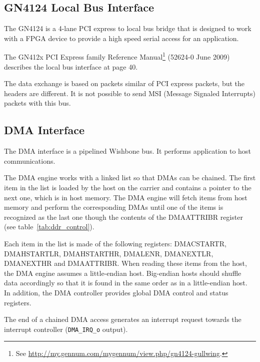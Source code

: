 \documentclass[10pt,a4paper]{cerndoc}
\begin{document}
    \subsection{GN4124 Local Bus Interface}
    
The GN4124 is a 4-lane PCI express to local bus bridge that is designed to work with a FPGA device to provide a high speed serial access for an application.
    
The GN412x PCI Express family Reference Manual\footnote{See \href{http://my.gennum.com/mygennum/view.php/gn4124-gullwing}{http://my.gennum.com/mygennum/view.php/gn4124-gullwing}.} (52624-0 June 2009) describes the local bus interface at page 40.

The data exchange is based on packets similar of PCI express packets, but the headers are different. It is not possible to send MSI (Message Signaled Interrupts) packets with this bus.
    
    \subsection{DMA Interface}
The DMA interface is a pipelined Wishbone bus. It performs application to host communications.

The DMA engine works with a linked list so that DMAs can be chained. The first item in the list is loaded by the host on the carrier and contains a pointer to the next one, which is in host memory. The DMA engine will fetch items from host memory and perform the corresponding DMAs until one of the items is recognized as the last one though the contents of the DMAATTRIBR register (see table~\ref{tab:ddr_control}). 

Each item in the list is made of the following registers: DMACSTARTR, DMAHSTARTLR, DMAHSTARTHR, DMALENR, DMANEXTLR, DMANEXTHR and DMAATTRIBR. When reading these items from the host, the DMA engine assumes a little-endian host. Big-endian hosts should shuffle data accordingly so that it is found in the same order as in a little-endian host. In addition, the DMA controller provides global DMA control and status registers.

The end of a chained DMA access generates an interrupt request towards the interrupt controller (\verb+DMA_IRQ_o+ output).  
\end{document}
